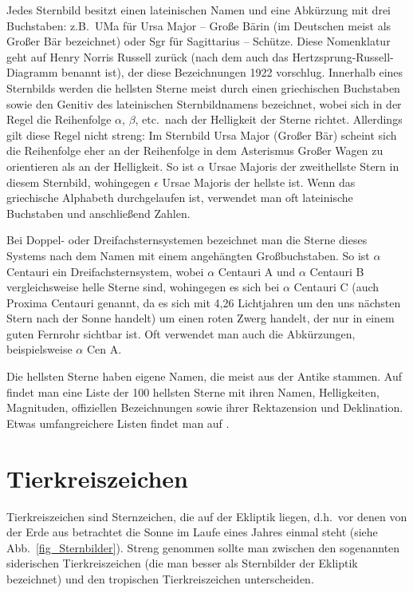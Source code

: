 Jedes Sternbild besitzt einen lateinischen Namen und eine Abk\"urzung mit drei Buchstaben: z.B.\ UMa f\"ur 
Ursa Major
 -- Gro\ss e B\"arin (im Deutschen meist als Gro\ss er B\"ar bezeichnet) oder Sgr f\"ur 
 Sagittarius -- Sch\"utze.
Diese Nomenklatur geht auf Henry Norris Russell zur\"uck (nach dem auch das Hertzsprung-Russell-Diagramm
benannt ist), der diese Bezeichnungen 1922 vorschlug. Innerhalb eines Sternbilds werden die hellsten Sterne
meist durch einen griechischen Buchstaben sowie den Genitiv des lateinischen Sternbildnamens 
bezeichnet, wobei sich in
der Regel die Reihenfolge $\alpha$, $\beta$, etc.\ nach der Helligkeit der Sterne richtet. Allerdings gilt diese Regel
nicht streng: Im Sternbild Ursa Major (Gro\ss er B\"ar) scheint sich die Reihenfolge eher an der Reihenfolge in
dem Asterismus Gro\ss er Wagen zu orientieren als an der Helligkeit. So ist $\alpha$ Ursae Majoris der zweithellste
Stern in diesem Sternbild, wohingegen $\epsilon$ Ursae Majoris der hellste ist. Wenn das griechische Alphabeth
durchgelaufen ist, verwendet man oft lateinische Buchstaben und anschlie\ss end Zahlen. 

Bei Doppel- oder Dreifachsternsystemen bezeichnet man die Sterne dieses Systems nach dem Namen mit einem
angeh\"angten Gro\ss buchstaben.
So ist $\alpha$ Centauri ein 
Dreifachsternsystem, wobei $\alpha$ Centauri A und $\alpha$ Centauri B
vergleichsweise helle Sterne sind, wohingegen es sich bei 
$\alpha$ Centauri C (auch Proxima Centauri genannt, da
es sich mit 4,26 Lichtjahren um den uns n\"achsten Stern nach der Sonne handelt) um einen roten Zwerg handelt, der
nur in einem guten Fernrohr sichtbar ist. Oft verwendet man auch die Abk\"urzungen, beispielsweise $\alpha$ Cen A. 

Die hellsten Sterne haben eigene Namen, die meist aus der Antike stammen. Auf \cite{Wiki_hellste} findet man
eine Liste der 100 hellsten Sterne mit ihren Namen, Helligkeiten, Magnituden, offiziellen Bezeichnungen sowie
ihrer Rektazension und Deklination. Etwas umfangreichere Listen findet man auf \cite{brightest}.         

\section{Tierkreiszeichen}

Tierkreiszeichen 
sind Sternzeichen, die auf der Ekliptik liegen, d.h.\ vor denen von der Erde aus betrachtet 
die Sonne im Laufe eines Jahres einmal steht (siehe Abb.\ \ref{fig_Sternbilder}). 
Streng genommen sollte man zwischen den sogenannten
siderischen Tierkreiszeichen (die man besser als Sternbilder der Ekliptik bezeichnet) 
und den tropischen Tierkreiszeichen unterscheiden. 

